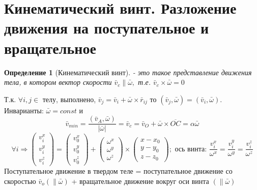 \documentclass[12pt]{article}
\newtheorem{determenition}{Определение}
\begin{document}
\section{Кинематический винт. Разложение движения на поступательное и вращательное}
\vspace{-10pt}
\begin{determenition}[Кинематический винт]
	- это такое представление движения тела, в котором вектор скорости $\bar{v}_c \parallel \bar{\omega},  $ т.е. $\bar{v}_c \times \bar{\omega} =0 $
\end{determenition}
Т.к.  $\forall i,j\in$ телу, выполнено, $\bar{v}_j=\bar{v}_i+\bar{\omega}\times \bar{r}_{ij}$ то $(\bar{v}_j, \bar{\omega})= (\bar{v}_i, \bar{\omega})$. Инварианты: $\bar{\omega}=const$  и
\vspace{-6pt}
$$\bar{v}_{min} = \frac{(\bar{v}_A, \bar{\omega})}{|\bar{\omega}|}= \bar{v}_{c} = \bar{v}_O + \bar{\omega} \times \overline{OC} = \alpha \bar{\omega} $$
	$$\forall i\Rightarrow   
	\begin{pmatrix} v^x_i \\v^y_i\\ v^z_i\end{pmatrix} = 
	\begin{pmatrix} v^x_0 \\v^y_0\\ v^z_0\end{pmatrix} + 
	\begin{pmatrix} \omega^x \\\omega^y\\ \omega^z\end{pmatrix} \times 
	\begin{pmatrix} x-x_0 \\y-y_0\\ z-z_0\end{pmatrix};
	 \text{ ось винта: }\frac{v_i^x}{\omega^x}=\frac{v_i^y}{\omega^y} = \frac{v_i^z}{\omega^z}$$
	Поступательное движение в твердом теле = поступательное движение со скоростью $\bar{v}_o (\parallel \bar{\omega}) $ + вращательное движение вокруг оси винта $(\parallel\bar{\omega}) $
\end{document}
